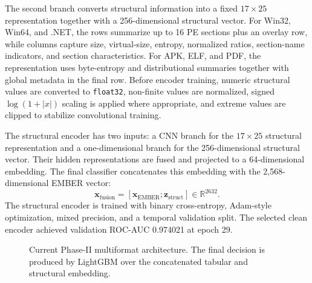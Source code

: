\documentclass[conference]{IEEEtran}
\begin{document}
The second branch converts structural information into a fixed $17\times25$ representation together with a 256-dimensional structural vector. For Win32, Win64, and .NET, the rows summarize up to 16 PE sections plus an overlay row, while columns capture size, virtual-size, entropy, normalized ratios, section-name indicators, and section characteristics. For APK, ELF, and PDF, the representation uses byte-entropy and distributional summaries together with global metadata in the final row. Before encoder training, numeric structural values are converted to \texttt{float32}, non-finite values are normalized, signed $\log(1+|x|)$ scaling is applied where appropriate, and extreme values are clipped to stabilize convolutional training.

The structural encoder has two inputs: a CNN branch for the $17\times25$ structural representation and a one-dimensional branch for the 256-dimensional structural vector. Their hidden representations are fused and projected to a 64-dimensional embedding. The final classifier concatenates this embedding with the 2,568-dimensional EMBER vector:
\begin{equation}
\mathbf{x}_{\mathrm{fusion}} = [\mathbf{x}_{\mathrm{EMBER}};\mathbf{z}_{\mathrm{struct}}]
\in \mathbb{R}^{2632}.
\end{equation}
The structural encoder is trained with binary cross-entropy, Adam-style optimization, mixed precision, and a temporal validation split. The selected clean encoder achieved validation ROC-AUC 0.974021 at epoch 29.

\begin{figure}[t]
\centering
{}
\caption{Current Phase-II multiformat architecture. The final decision is produced by LightGBM over the concatenated tabular and structural embedding.}
\label{fig:phase2_architecture}
\end{figure}
\end{document}
